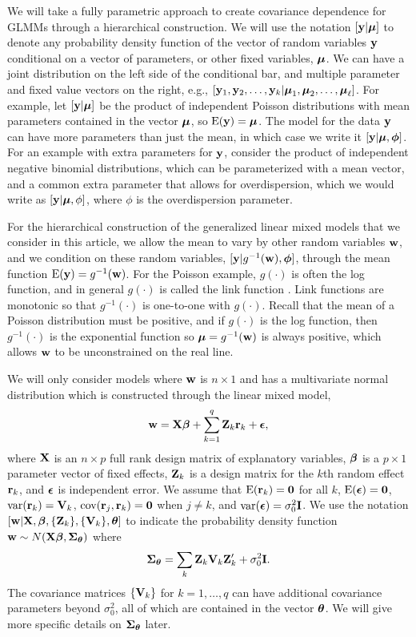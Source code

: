 \documentclass[12pt, titlepage]{article}
\begin{document}
We will take a fully parametric approach to create covariance dependence for GLMMs through a hierarchical construction.  We will use the notation $[\mathbf{y}|\boldsymbol{\mu}]$ to denote any probability density function of the vector of random variables $\mathbf{y}$ conditional on a vector of parameters, or other fixed variables, $\boldsymbol{\mu}$. We can have a joint distribution on the left side of the conditional bar, and multiple parameter and fixed value vectors on the right, e.g., $[\mathbf{y}_{1},\mathbf{y}_{2}, \ldots, \mathbf{y}_{k} | \boldsymbol{\mu}_{1}, \boldsymbol{\mu}_{2}, \ldots, \boldsymbol{\mu}_{\ell}]$. For example, let $[\mathbf{y}|\boldsymbol{\mu}]$ be the product of independent Poisson distributions with mean parameters contained in the vector $\boldsymbol{\mu}$, so $\textrm{E}(\mathbf{y}) = \boldsymbol{\mu}$. The model for the data $\mathbf{y}$ can have more parameters than just the mean, in which case we write it $[\mathbf{y}|\boldsymbol{\mu},\boldsymbol{\phi}]$. For an example with extra parameters for $\mathbf{y}$, consider the product of independent negative binomial distributions, which can be parameterized with a mean vector, and a common extra parameter that allows for overdispersion, which we would write as $[\mathbf{y}|\boldsymbol{\mu},\phi]$, where $\phi$ is the overdispersion parameter.

For the hierarchical construction of the generalized linear mixed models that we consider in this article, we allow the mean to vary by other random variables $\mathbf{w}$, and we condition on these random variables, $[\mathbf{y}|g^{-1}(\mathbf{w}),\boldsymbol{\phi}]$, through the mean function $\textrm{E}(\mathbf{y}) = g^{-1}(\mathbf{w})$. For the Poisson example, $g(\cdot)$ is often the log function, and in general $g(\cdot)$ is called the link function \citep{McCullaghEtAl1989GeneralizedLinearModels}.  Link functions are monotonic so that $g^{-1}(\cdot)$ is one-to-one with $g(\cdot)$. Recall that the mean of a Poisson distribution must be positive, and if $g(\cdot)$ is the log function, then $g^{-1}(\cdot)$ is the exponential function so $\boldsymbol{\mu} = g^{-1}(\mathbf{w})$ is always positive, which allows $\mathbf{w}$ to be unconstrained on the real line.

We will only consider models where $\mathbf{w}$ is $n \times 1$ and has a multivariate normal distribution which is constructed through the linear mixed model,
\begin{equation} \label{eq:lm_eta}
\mathbf{w} = \mathbf{X}\boldsymbol{\beta} + \sum_{k=1}^{q}\mathbf{Z}_{k}\mathbf{r}_{k} + \mbox{\boldmath $\epsilon$},
\end{equation}
where $\mathbf{X}$ is an $n \times p$ full rank design matrix of explanatory variables, $\boldsymbol{\beta}$ is a $p \times 1$ parameter vector of fixed effects, $\mathbf{Z}_{k}$ is a design matrix for the $k$th random effect $\mathbf{r}_{k}$, and $\mbox{\boldmath $\epsilon$}$ is independent error.  We assume that $\textrm{E}(\mathbf{r}_{k}) = \mathbf{0}$ for all $k$, $\textrm{E}(\mbox{\boldmath $\epsilon$}) = \mathbf{0}$, $\textrm{var}(\mathbf{r}_{k}) = \mathbf{V}_{k}$, $\textrm{cov}(\mathbf{r}_{j}, \mathbf{r}_{k}) = \mathbf{0}$ when $j \ne k$, and $\textrm{var}(\mbox{\boldmath $\epsilon$}) = \sigma^{2}_{0}\mathbf{I}$. We use the notation $[\mathbf{w}|\mathbf{X},\boldsymbol{\beta},\{\mathbf{Z}_{k}\},\{\mathbf{V}_{k}\},\boldsymbol{\theta}]$ to indicate the probability density function $\mathbf{w} \sim N(\mathbf{X}\boldsymbol{\beta},\mbox{\boldmath $\Sigma$}_{\boldsymbol{\theta}})$ where 
$$
\mbox{\boldmath $\Sigma$}_{\boldsymbol{\theta}} = \sum_{k}\mathbf{Z}_{k}\mathbf{V}_{k}\mathbf{Z}_{k}^{\prime} + \sigma^{2}_{0}\mathbf{I}.
$$
The covariance matrices $\{\mathbf{V}_{k}\}$ for $k = 1,\ldots,q$ can have additional covariance parameters beyond $\sigma^{2}_{0}$, all of which are contained in the vector $\boldsymbol{\theta}$.  We will give more specific details on $\mbox{\boldmath $\Sigma$}_{\boldsymbol{\theta}}$ later.
\end{document}
